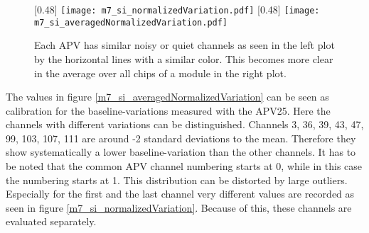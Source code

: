 \documentclass[
twoside,            %
BCOR1.4cm,          %
10pt,               %
headings=normal,    %
headsepline,        %
clearplainpage,		%
final,              %
div=14,
open=right,
bibliography=toc
]{scrreprt}
\begin{document}
\begin{figure}[!h]
	\centering
	[0.48\textwidth]
	{\texttt{[image: m7\_si\_normalizedVariation.pdf]}}
	\hfill
	[0.48\textwidth]
	{\texttt{[image: m7\_si\_averagedNormalizedVariation.pdf]}}
	\vspace{-2mm}
	\caption{
		Each APV has similar noisy or quiet channels as seen in the left plot by the horizontal lines with a similar color.
		This becomes more clear in the average over all chips of a module in the right plot.
	}
\end{figure}

The values in figure \ref{m7_si_averagedNormalizedVariation} can be seen as calibration for the baseline-variations measured with the APV25.
Here the channels with different variations can be distinguished. 
Channels 3, 36, 39, 43, 47, 99, 103, 107, 111 are around -2 standard deviations to the mean.
Therefore they show systematically a lower baseline-variation than the other channels.
It has to be noted that the common APV channel numbering starts at 0, while in this case the numbering starts at 1.
This distribution can be distorted by large outliers.
Especially for the first and the last channel very different values are recorded as seen in figure \ref{m7_si_normalizedVariation}.
Because of this, these channels are evaluated separately.
\end{document}
